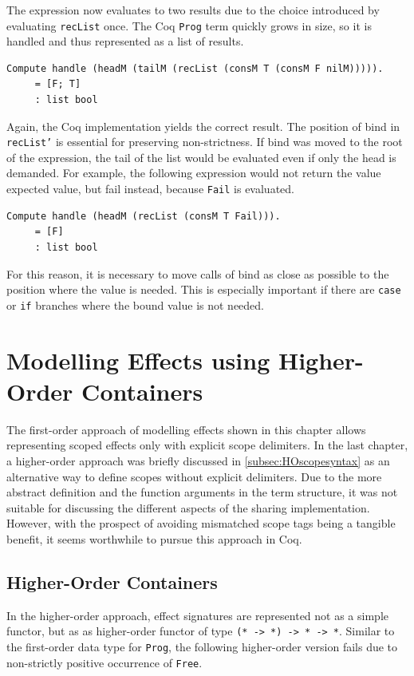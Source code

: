 \documentclass[a4paper, 11pt, fleqn, twoside]{scrreprt}
\newcommand{\hinl}[1]{\texttt{#1}}
\newcommand{\cinl}[1]{\texttt{#1}}
\begin{document}
The expression now evaluates to two results due to the choice introduced by evaluating \hinl{recList} once.
The Coq \cinl{Prog} term quickly grows in size, so it is handled and thus represented as a list of results.

\begin{verbatim}
Compute handle (headM (tailM (recList (consM T (consM F nilM))))).
     = [F; T]
     : list bool
\end{verbatim}

Again, the Coq implementation yields the correct result.
The position of bind in \cinl{recList'} is essential for preserving non-strictness.
If bind was moved to the root of the expression, the tail of the list would be evaluated even if only the head is demanded.
For example, the following expression would not return the value expected value, but fail instead, because \cinl{Fail} is evaluated.

\begin{verbatim}
Compute handle (headM (recList (consM T Fail))).
     = [F]
     : list bool
\end{verbatim}

For this reason, it is necessary to move calls of bind as close as possible to the position where the value is needed.
This is especially important if there are \cinl{case} or \cinl{if} branches where the bound value is not needed.

\section{Modelling Effects using Higher-Order Containers}
\label{sec:coqHO}

The first-order approach of modelling effects shown in this chapter allows representing scoped effects only with explicit scope delimiters.
In the last chapter, a higher-order approach was briefly discussed in \autoref{subsec:HOscopesyntax} as an alternative way to define scopes without explicit delimiters.
Due to the more abstract definition and the function arguments in the term structure, it was not suitable for discussing the different aspects of the sharing implementation.
However, with the prospect of avoiding mismatched scope tags being a tangible benefit, it seems worthwhile to pursue this approach in Coq.

\subsection{Higher-Order Containers}
\label{subsec-higherOrderContainers}
In the higher-order approach, effect signatures are represented not as a simple functor, but as as higher-order functor of type \hinl{(* -> *) -> * -> *}.
Similar to the first-order data type for \hinl{Prog}, the following higher-order version fails due to non-strictly positive occurrence of \cinl{Free}.
\end{document}
